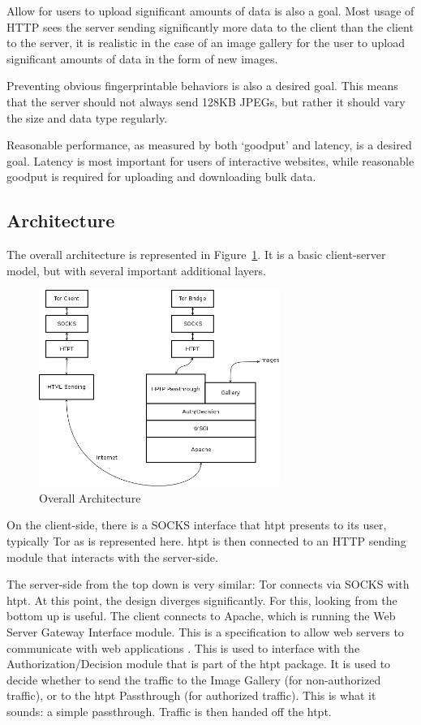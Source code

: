 Allow for users to upload significant amounts of data is also a goal. Most usage of HTTP sees the server sending significantly more data to the client than the client to the server, it is realistic in the case of an image gallery for the user to upload significant amounts of data in the form of new images.

Preventing obvious fingerprintable behaviors is also a desired goal. This means that the server should not always send 128KB JPEGs, but rather it should vary the size and data type regularly.  

Reasonable performance, as measured by both `goodput' and latency, is a desired goal. Latency is most important for users of interactive websites, while reasonable goodput is required for uploading and downloading bulk data. 

\subsection{Architecture}
The overall architecture is represented in Figure~\ref{fig:overall_arch}. It is a basic client-server model, but with several important additional layers.

\begin{figure}[h]
\centering
\includegraphics[width=0.7\textwidth]{Overall_architecture}
\caption{Overall Architecture}
\label{fig:overall_arch}
\end{figure}

On the client-side, there is a SOCKS interface that htpt presents to its user, typically Tor as is represented here. htpt is then connected to an HTTP sending module that interacts with the server-side.

The server-side from the top down is very similar: Tor connects via SOCKS with htpt. At this point, the design diverges significantly. For this, looking from the bottom up is useful. The client connects to Apache, which is running the Web Server Gateway Interface module. This is a specification to allow web servers to communicate with web applications \cite{Ref16}. This is used to interface with the Authorization/Decision module that is part of the htpt package. It is used to decide whether to send the traffic to the Image Gallery (for non-authorized traffic), or to the htpt Passthrough (for authorized traffic). This is what it sounds: a simple passthrough. Traffic is then handed off the htpt. 

